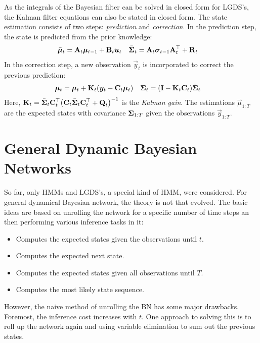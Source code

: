 			As the integrals of the Bayesian filter can be solved in closed form for LGDS's, the Kalman filter equations can also be stated in closed form. The state estimation consists of two steps: \emph{prediction} and \emph{correction}. In the prediction step, the state is predicted from the prior knowledge:
			\begin{align}
				\bar{\bm{\mu}}_t    & = \bm{\mathrm{A}}_t \bm{\mu}_{t - 1} + \bm{\mathrm{B}}_t \bm{u}_t        &
				\bar{\bm{\mathrm{\Sigma}}}_t & =\bm{\mathrm{A}}_t \bm{\mathrm{\sigma}}_{t - 1} \bm{\mathrm{A}}_t^\top + \bm{\mathrm{R}}_t
			\end{align}
			In the correction step, a new observation \(\vec{y}_t\) is incorporated to correct the previous prediction:
			\begin{align}
				\bm{\mu}_t    & = \bar{\bm{\mu}}_t + \bm{\mathrm{K}}_t (\bm{y}_t - \bm{\mathrm{C}}_t \bar{\bm{\mu}}_t) &
				\bm{\mathrm{\Sigma}}_t & = (\bm{\mathrm{I}} - \bm{\mathrm{K}}_t \bm{\mathrm{C}}_t) \bar{\bm{\mathrm{\Sigma}}}_t
			\end{align}
			Here, \( \bm{\mathrm{K}}_t = \bar{\bm{\mathrm{\Sigma}}}_t \bm{\mathrm{C}}_t^\top \bigl( \bm{\mathrm{C}}_t \bar{\bm{\mathrm{\Sigma}}}_t \bm{\mathrm{C}}_t^\top + \bm{\mathrm{Q}}_t \bigr)^{-1} \) is the \emph{Kalman gain}. The estimations \( \vec{\mu}_{1:T} \) are the expected states with covariance \( \bm{\mathrm{\Sigma}}_{1:T} \) given the observations \( \vec{y}_{1:T} \).

	\section{General Dynamic Bayesian Networks}
		So far, only HMMs and LGDS's, a special kind of HMM, were considered. For general dynamical Bayesian network, the theory is not that evolved. The basic ideas are based on unrolling the network for a specific number of time steps an then performing various inference tasks in it:
		\begin{itemize}
			\item {}  Computes the expected states given the observations until \(t\).
			\item {} Computes the expected next state.
			\item {}  Computes the expected states given all observations until \(T\).
			\item {}        Computes the most likely state sequence.
		\end{itemize}
		However, the naive method of unrolling the BN has some major drawbacks. Foremost, the inference cost increases with \(t\). One approach to solving this is to roll up the network again and using variable elimination to sum out the previous states.

